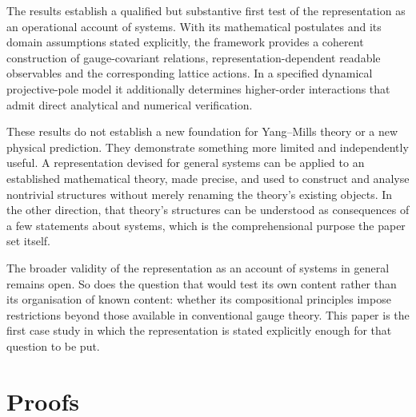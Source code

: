 \documentclass[11pt,a4paper]{article}
\theoremstyle{plain}
\theoremstyle{definition}
\theoremstyle{remark}
\begin{document}
The results establish a qualified but substantive first test of the representation as an operational account of systems. With its mathematical postulates and its domain assumptions stated explicitly, the framework provides a coherent construction of gauge-covariant relations, representation-dependent readable observables and the corresponding lattice actions. In a specified dynamical projective-pole model it additionally determines higher-order interactions that admit direct analytical and numerical verification.

These results do not establish a new foundation for Yang--Mills theory or a new physical prediction. They demonstrate something more limited and independently useful. A representation devised for general systems can be applied to an established mathematical theory, made precise, and used to construct and analyse nontrivial structures without merely renaming the theory's existing objects. In the other direction, that theory's structures can be understood as consequences of a few statements about systems, which is the comprehensional purpose the paper set itself.

The broader validity of the representation as an account of systems in general remains open. So does the question that would test its own content rather than its organisation of known content: whether its compositional principles impose restrictions beyond those available in conventional gauge theory. This paper is the first case study in which the representation is stated explicitly enough for that question to be put.

\appendix

\section{Proofs}\label{app:proofs}
\end{document}
